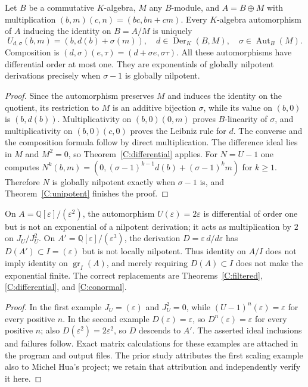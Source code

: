 \begin{proposition}
\label{C:squarezero}
Let $B$ be a commutative $K$-algebra, $M$ any $B$-module, and $A=B\oplus M$ with multiplication
$(b,m)(c,n)=(bc,bn+cm)$. Every $K$-algebra automorphism of $A$ inducing the identity on $B=A/M$ is uniquely
\[
U_{d,\sigma}(b,m)=(b,d(b)+\sigma(m)),
\quad d\in\operatorname{Der}_K(B,M),\quad\sigma\in\operatorname{Aut}_B(M).
\]
Composition is $(d,\sigma)(e,\tau)=(d+\sigma e,\sigma\tau)$. All these automorphisms have differential order at most one. They are exponentials of globally nilpotent derivations precisely when $\sigma-1$ is globally nilpotent.
\end{proposition}
\begin{proof}
Since the automorphism preserves $M$ and induces the identity on the quotient, its restriction to $M$ is an additive bijection $\sigma$, while its value on $(b,0)$ is $(b,d(b))$. Multiplicativity on $(b,0)(0,m)$ proves $B$-linearity of $\sigma$, and multiplicativity on $(b,0)(c,0)$ proves the Leibniz rule for $d$. The converse and the composition formula follow by direct multiplication. The difference ideal lies in $M$ and $M^2=0$, so Theorem~\ref{C:differential} applies. For $N=U-1$ one computes
$N^k(b,m)=(0,(\sigma-1)^{k-1}d(b)+(\sigma-1)^k m)$ for $k\geq1$. Therefore $N$ is globally nilpotent exactly when $\sigma-1$ is, and Theorem~\ref{C:unipotent} finishes the proof.
\end{proof}

\begin{proposition}
\label{C:counterexamples}
On $A=\mathbb Q[\varepsilon]/(\varepsilon^2)$, the automorphism $U(\varepsilon)=2\varepsilon$ is differential of order one but is not an exponential of a nilpotent derivation; it acts as multiplication by $2$ on $J_U/J_U^2$. On $A'=\mathbb Q[\varepsilon]/(\varepsilon^3)$, the derivation $D=\varepsilon\,d/d\varepsilon$ has $D(A')\subset I=(\varepsilon)$ but is not locally nilpotent. Thus identity on $A/I$ does not imply identity on $\operatorname{gr}_I(A)$, and merely requiring $D(A)\subset I$ does not make the exponential finite. The correct replacements are Theorems~\ref{C:filtered}, \ref{C:differential}, and \ref{C:conormal}.
\end{proposition}
\begin{proof}
In the first example $J_U=(\varepsilon)$ and $J_U^2=0$, while $(U-1)^n(\varepsilon)=\varepsilon$ for every positive $n$. In the second example $D(\varepsilon)=\varepsilon$, so $D^n(\varepsilon)=\varepsilon$ for every positive $n$; also $D(\varepsilon^2)=2\varepsilon^2$, so $D$ descends to $A'$. The asserted ideal inclusions and failures follow. Exact matrix calculations for these examples are attached in the program and output files. The prior study attributes the first scaling example also to Michel Hua's project; we retain that attribution and independently verify it here.
\end{proof}

